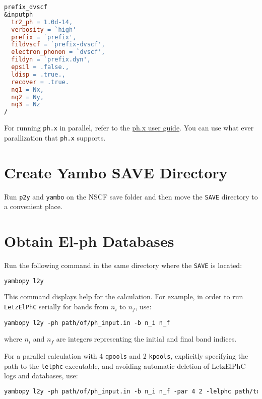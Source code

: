 \documentclass[12pt,twoside,openany]{book}
\begin{document}
\begin{lstlisting}[language=make]
prefix_dvscf
&inputph
  tr2_ph = 1.0d-14,
  verbosity = `high'
  prefix = `prefix',
  fildvscf = `prefix-dvscf',
  electron_phonon = `dvscf',
  fildyn = `prefix.dyn',
  epsil = .false.,
  ldisp = .true.,
  recover = .true.
  nq1 = Nx,
  nq2 = Ny,
  nq3 = Nz
/
\end{lstlisting}

For running \texttt{ph.x} in parallel, refer to the \href{https://www.quantum-espresso.org/Doc/ph_user_guide/node17.html}{ph.x user guide}. You can use what ever parallization that \texttt{ph.x} supports.

\section{Create Yambo SAVE Directory}

Run \texttt{p2y} and \texttt{yambo} on the NSCF save folder and then move the \texttt{SAVE} directory to a convenient place.

\section{Obtain El-ph Databases}

Run the following command in the same directory where the \texttt{SAVE} is located:

\begin{lstlisting}[language=make]
yambopy l2y
\end{lstlisting}

This command displays help for the calculation. For example, in order to run \texttt{LetzElPhC} serially for bands from \(n_i\) to \(n_f\), use:

\begin{lstlisting}[]
yambopy l2y -ph path/of/ph_input.in -b n_i n_f
\end{lstlisting}

where \(n_i\) and \(n_f\) are integers representing the initial and final band indices.

For a parallel calculation with 4 \texttt{qpools} and 2 \texttt{kpools}, explicitly specifying the path to the \texttt{lelphc} executable, and avoiding automatic deletion of LetzElPhC logs and databases, use:

\begin{lstlisting}[language=make]
yambopy l2y -ph path/of/ph_input.in -b n_i n_f -par 4 2 -lelphc path/to/lelphc_exe -D
\end{lstlisting}
\end{document}
